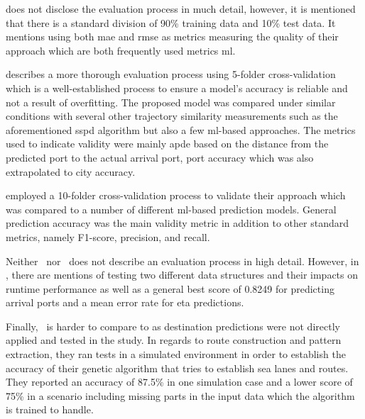 \cite{lechtenberg2019} does not disclose the evaluation process in much detail, however, it is mentioned that there is a standard division of 90\% training data and 10\% test data. It mentions using both \acrshort{mae} and \acrshort{rmse} as metrics measuring the quality of their approach which are both frequently used metrics \acrshort{ml}.

\cite{Zhang2020AISApproach} describes a more thorough evaluation process using 5-folder cross-validation which is a well-established process to ensure a model's accuracy is reliable and not a result of overfitting. The proposed model was compared under similar conditions with several other trajectory similarity measurements such as the aforementioned \acrshort{sspd} algorithm but also a few \acrshort{ml}-based approaches. The metrics used to indicate validity were mainly \acrfull{apde} based on the distance from the predicted port to the actual arrival port, port accuracy which was also extrapolated to city accuracy.

\cite{Karatas2020TrajectoryData} employed a 10-folder cross-validation process to validate their approach which was compared to a number of different \acrshort{ml}-based prediction models. General prediction accuracy was the main validity metric in addition to other standard metrics, namely F1-score, precision, and recall.

Neither~\cite{Bachar2018GrandDestination} nor~\cite{Rosca2018GrandRoutes} does not describe an evaluation process in high detail. However, in \cite{Rosca2018GrandRoutes}, there are mentions of testing two different data structures and their impacts on runtime performance as well as a general best score of 0.8249 for predicting arrival ports and a mean error rate for \acrshort{eta} predictions.

Finally,~\cite{Dobrkovic2018MaritimeData} is harder to compare to as destination predictions were not directly applied and tested in the study. In regards to route construction and pattern extraction, they ran tests in a simulated environment in order to establish the accuracy of their genetic algorithm that tries to establish sea lanes and routes. They reported an accuracy of 87.5\% in one simulation case and a lower score of 75\% in a scenario including missing parts in the input data which the algorithm is trained to handle.


